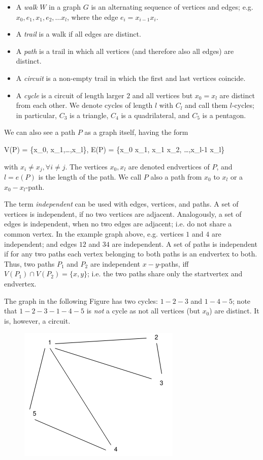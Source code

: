 \begin{itemize}
\item A \emph{walk} $W$ in a graph $G$ is an alternating sequence of vertices and edges; e.g. $x_0, e_1, x_1, e_2, \ldots x_l$, where the edge $e_i = x_{i-1}x_i$.
\item A \emph{trail} is a walk if all edges are distinct.
\item A \emph{path} is a trail in which all vertices (and therefore also all edges) are distinct.
\item A \emph{circuit} is a non-empty trail in which the first and last vertices coincide.
\item A \emph{cycle} is a circuit of length larger $2$ and all vertices but $x_0=x_l$ are distinct from each other. We denote cycles of length $l$ with $C_l$ and call them $l$-cycles; in particular, $C_3$ is a triangle, $C_4$ is a quadrilateral, and $C_5$ is a pentagon.
\end{itemize}

We can also see a path $P$ as a graph itself, having the form

\bee
V(P) = \{x_0, x_1,\ldots,x_l\}, \quad E(P) = \{x_0 x_1, x_1 x_2, \ldots,x_{l-1} x_l\}
\eee

with $x_i \neq x_j, \forall i \neq j$. The vertices $x_0, x_l$ are denoted endvertices of $P$, and $l=e(P)$ is the length of the path. We call $P$ also a path from $x_0$ to $x_l$ or a $x_0 - x_l$-path.

The term \emph{independent} can be used with edges, vertices, and paths. A set of vertices is independent, if no two vertices are adjacent. Analogously, a set of edges is independent, when no two edges are adjacent; i.e. do not share a common vertex. In the example graph above, e.g. vertices $1$ and $4$ are independent; and edges $12$ and $34$ are independent. A set of paths is independent if for any two paths each vertex belonging to both paths is an endvertex to both. Thus, two paths $P_1$ and $P_2$ are independent $x-y$-paths, iff $V(P_1) \cap V(P_2) = \{x,y\}$; i.e. the two paths share only the startvertex and endvertex.

The graph in the following Figure has two cycles: $1-2-3$ and $1-4-5$; note that $1-2-3-1-4-5$ is \emph{not} a cycle as not all vertices (but $x_0$) are distinct. It is, however, a circuit.

\begin{figure}[H]
\centering
\includegraphics[scale=0.5]{images/graphs_03_02.png}
\end{figure}

